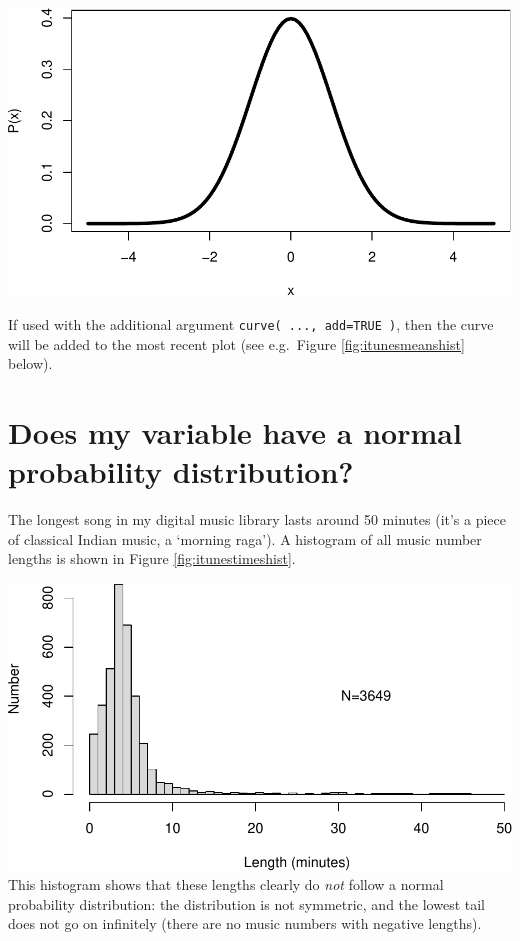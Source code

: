 \documentclass[
]{book}
\begin{document}
\includegraphics{QMS-EN_files/figure-latex/curve.dnorm-1.pdf}

If used with the additional argument \texttt{curve(\ ...,\ add=TRUE\ )}, then the curve will be added to the most recent plot (see e.g.~Figure \ref{fig:itunesmeanshist} below).

\hypertarget{sec:isvarnormaldistributed}{%
\section{Does my variable have a normal probability distribution?}\label{sec:isvarnormaldistributed}}

The longest song in my digital music library lasts around 50
minutes (it's a piece of classical Indian music, a `morning raga').
A histogram of all music number lengths is shown in
Figure \ref{fig:itunestimeshist}.

\includegraphics{QMS-EN_files/figure-latex/itunestimeshist-1.pdf}
This histogram shows that these lengths clearly
do \emph{not} follow a normal probability distribution: the distribution is not
symmetric, and the lowest tail does not go on infinitely (there are
no music numbers with negative lengths).
\end{document}
